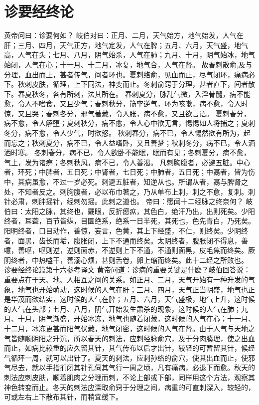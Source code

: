\documentclass[a4paper,12pt,UTF8,twoside]{ctexbook}
\begin{document}
\chapter{诊要经终论}
黄帝问曰：诊要何如？
岐伯对曰：正月、二月，天气始方，地气始发，人气在肝；三月、四月，天气正方，地气定发，人气在脾；五月、六月，天气盛，地气高，人气在头；七月、八月，阴气始杀，人气在肺；九月、十月，阴气始冰，地气始闭，人气在心；十一月、十二月，冰复，地气合，人气在肾。
故春刺散俞,及与分理，血出而上，甚者传气，间者环也。夏刺络俞，见血而止，尽气闭环，痛病必下。秋刺皮肤，循理，上下同法，神变而止。冬刺俞窍于分理，甚者直下，间者散下。春夏秋冬，各有所刺，法其所在。
春刺夏分，脉乱气微，入淫骨髓，病不能愈，令人不嗜食，又且少气；春刺秋分，筋挛逆气，环为咳嗽，病不愈，令人时惊，又且哭；春刺冬分，邪气著藏，令人胀，病不愈，又且欲言语。
夏刺春分，病不愈，令人解堕；夏刺秋分，病不愈，令人心中欲无言，惕惕如人将捕之；夏刺冬分，病不愈，令人少气，时欲怒。
秋刺春分，病不已，令人惕然欲有所为，起而忘之；秋刺夏分，病不已，令人益嗜卧，又且善梦；秋刺冬分，病不已，令人洒洒时寒。
冬刺春分，病不已，令人欲卧不能眠，眠而有见；冬刺夏分，病不愈，气上，发为诸痹；冬刺秋风，病不已，令人善渴。
凡刺胸腹者，必避五脏。中心者，环死；中脾者，五日死；中肾者，七日死；中肺者，五日死；中鬲者，皆为伤中，其病虽愈，不过一岁必死。刺避五脏者，知逆从也。所谓从者，鬲与脾肾之处，不知者反之。刺胸腹者，必以布巾著之，乃从单布上刺，刺之不愈，复刺。刺针必肃，刺肿摇针，经刺勿摇。此刺之道也。
帝曰：愿闻十二经脉之终奈何？
岐伯曰：太阳之脉，其终也，戴眼，反折瘛疭，其色白，绝汗乃出，出则死矣。少阳终者，耳聋，百节皆纵，目圜绝系，绝系一日半死，其死也，色先青白，乃死矣。阳明终者，口目动作，善惊，妄言，色黄，其上下经盛，不仁，则终矣。少阴终者，面黑，齿长而垢，腹胀闭，上下不通而终矣。太阴终者，腹胀闭不得息，善噫，善呕，呕则逆，逆则面赤，不逆则上下不通，不通则面黑，皮毛焦而终矣。厥阴终者，中热嗌干，善溺心烦，甚则舌卷，卵上缩而终矣。此十二经之所败也。
诊要经终论篇第十六参考译文
黄帝问道：诊病的重要关键是什麽？岐伯回答说：重要点在于天、地、人相互之间的关系。如正月、二月，天气开始有一种升发的气象，地气也开始萌动，这时候的人气在肝；三月、四月，天气正当明盛，地气也正是华茂而欲结实，这时候的人气在脾；五月、六月，天气盛极，地气上升，这时候的人气在头部；七月、八月，阴气开始发生肃杀的现象，这时候的人气在肺；九月、十月，阴气渐盛，开始冰冻，地气也随着闭藏，这时候的人气在心；十一月、十二月，冰冻更甚而阳气伏藏，地气闭密，这时候的人气在肾。由于人气与天地之气皆随顺阴阳之升沉，所以春天的刺法，应刺经脉俞穴，及于分肉腠理，使之出血而止，如病比较重的应久留其针，其气传布以后才出针，较轻的可暂留其针，候经气循环一周，就可以出针了。夏天的刺法，应刺孙络的俞穴，使其出血而止，使邪气尽去，就以手指扪闭其针孔伺其气行一周之顷，凡有痛病，必退下而愈。秋天的刺法应刺皮肤，顺着肌肉之分理而刺，不论上部或下部，同样用这个方法，观察其神色转变而止。冬天的刺法应深取俞窍于分理之间，病重的可直刺深入，较轻的，可或左右上下散布其针，而稍宜缓下。
\end{document}
